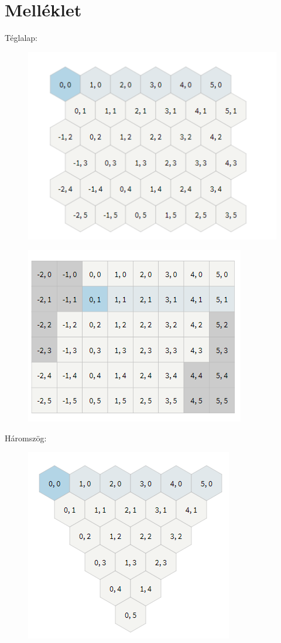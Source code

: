 \chapter*{Melléklet}

\noindent Téglalap:
\begin{figure}[h]
\centering
\includegraphics[scale=0.5]{kepek/img_m1.png}
\caption{}
\label{fig:img_m1}
\end{figure}

\begin{figure}[h]
\centering
\includegraphics[scale=0.5]{kepek/img_m2.png}
\caption{}
\label{fig:img_m2}
\end{figure}

\noindent Háromszög:
\begin{figure}[h]
\centering
\includegraphics[scale=0.5]{kepek/img_m3.png}
\caption{}
\label{fig:img_m3}
\end{figure}

